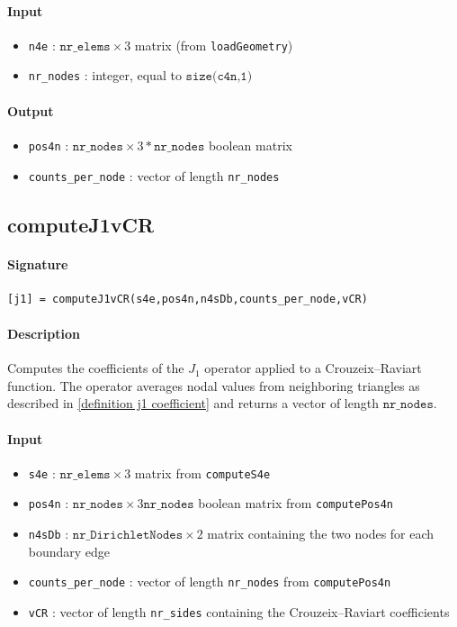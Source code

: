 \documentclass[11pt,a4paper]{article}
\begin{document}
\paragraph{Input}
\begin{itemize}
    \item \texttt{n4e} : $\texttt{nr\_elems} \times 3$ matrix (from \texttt{loadGeometry})
    \item \texttt{nr\_nodes} : integer, equal to $\texttt{size(c4n,1)}$
\end{itemize}

\paragraph{Output}
\begin{itemize}
    \item \texttt{pos4n} : $\texttt{nr\_nodes} \times 3*\texttt{nr\_nodes}$ 
          boolean matrix
    \item \texttt{counts\_per\_node} : vector of length \texttt{nr\_nodes}
\end{itemize}

\subsection{computeJ1vCR}

\paragraph{Signature}
\begin{verbatim}
[j1] = computeJ1vCR(s4e,pos4n,n4sDb,counts_per_node,vCR)
\end{verbatim}

\paragraph{Description}
Computes the coefficients of the $J_1$ operator applied to a 
Crouzeix--Raviart function. The operator averages nodal values from neighboring triangles as described in \eqref{definition j1 coefficient} and returns 
a vector of length $\texttt{nr\_nodes}$.

\paragraph{Input}
\begin{itemize}
    \item \texttt{s4e} : $\texttt{nr\_elems} \times 3$ matrix from \texttt{computeS4e}
    \item \texttt{pos4n} : $\texttt{nr\_nodes} \times 3\texttt{nr\_nodes}$ 
          boolean matrix from \texttt{computePos4n}
    \item \texttt{n4sDb} : $\texttt{nr\_DirichletNodes} \times 2$ matrix 
          containing the two nodes for each boundary edge
    \item \texttt{counts\_per\_node} : vector of length \texttt{nr\_nodes} from \texttt{computePos4n}
    \item \texttt{vCR} : vector of length \texttt{nr\_sides} containing the 
          Crouzeix--Raviart coefficients
\end{itemize}
\end{document}
